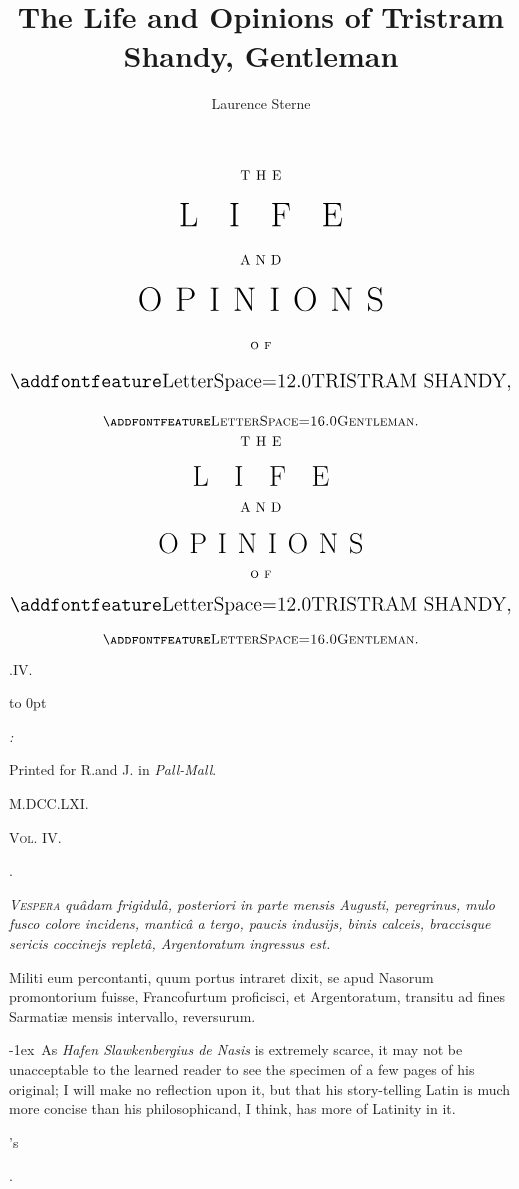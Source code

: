 \documentclass{article}
\title{The Life and Opinions of Tristram Shandy, Gentleman}
\author{Laurence Sterne}
\begin{document}
\pagestyle{empty}
\vfill
$$\vbox{\openup 16pt\halign{\hss #\hss\cr
\hbox to 3em{T H E}\cr
\hbox to 12em{\Huge L I F E}\cr
\hbox to 3em{A N D}\cr
\hbox to 18em{\Huge O P I N I O N S}\cr
\textsc{o f}\cr
\hbox{\Large \ls{TRISTRAM SHANDY},}\cr
\textsc{\lss{Gentleman}.}\cr
}}$$
\vfill
\newpage
\null
\newpage %
$$\vbox{\openup 12pt\halign{\hss #\hss\cr
\hbox to 3em{T H E}\cr
\lower 5pt\hbox to 10em{\huge L I F E}\cr
\hbox to 3em{A N D}\cr
\lower 6pt\hbox to 15em{\huge O P I N I O N S}\cr
\textsc{o f}\cr
\hbox{\Large \ls{TRISTRAM SHANDY},}\cr
\textsc{\lss{Gentleman}.}\cr
}}$$

\vfill

\vskip-2pt
\vskip-2pt
\vskip-2pt
\vskip-2pt
\vskip-2pt

\vfill

\centerline{\large{}.\quad IV.}

\vfill

\vbox to 0pt{\centerline{\itshape {}:}
\centerline{\small Printed for R.\@ and J.\@
{} in \textit{Pall-Mall}.}
\centerline{\small M.DCC.LXI.}\vss}
\newpage
\null
\newpage
\null
\vfill
\noindent
\textsc{Vol. IV.}
\setcounter{page}{1}
\setlength{\baselineskip}{14pt}  %
\newpage
\centerline{\large{}}
\centerline{\large{}.}

\bgroup\itshape\def\emph#1{{\normalshape #1}}
\lettrine{V}{\enspace espera} quâdam frigidulâ,
posteriori in parte mensis \emph{Augusti}, peregrinus, mulo fusco
colore incidens, manticâ a tergo, paucis indusijs, binis
calceis, braccisque sericis coccinejs repletâ, \emph{Argentoratum}
ingressus est.

Militi eum percontanti, quum portus intraret dixit, se apud
Nasorum promontorium fuisse, Francofurtum proficisci, et
Argentoratum, transitu ad fines Sarmatiæ mensis intervallo,
reversurum.\egroup

\vfill
\bgroup\fontsize{8}{9}\selectfont\indent\lower-1ex\hbox{\ast}\ 
As \textit{Hafen Slawkenbergius de Nasis} is extremely scarce, it may not be
unacceptable to the learned reader to see the specimen of a few pages of his
original; I will make no reflection upon it, but that his story-telling Latin
is much more concise than his philosophic\tsk and, I think, has more of
Latinity in it.\par
\egroup
\newpage
\centerline{\large{}'s}
\centerline{\large{}.}
\end{document}
